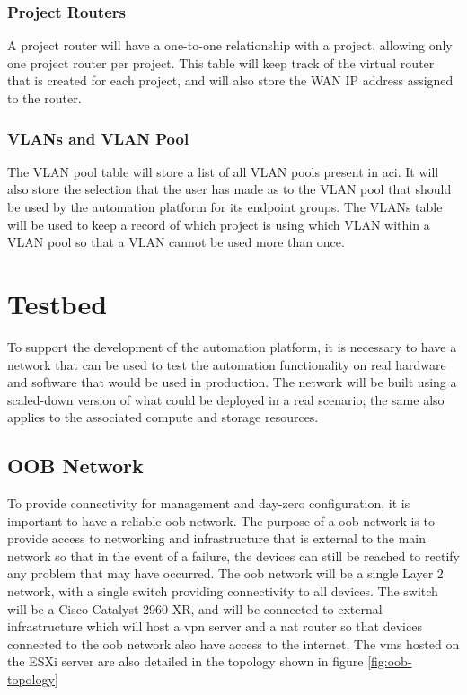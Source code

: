 \subsubsection{Project Routers}
\label{design:web-application:database:project-routers}
A project router will
have a one-to-one relationship with a project, allowing only one project router
per project. This table will keep track of the virtual router that is created
for each project, and will also store the WAN IP address assigned to the
router.

\subsubsection{VLANs and VLAN Pool}
\label{design:web-application:database:vlan-and-vlan-pool}
The VLAN pool table
will store a list of all VLAN pools present in \gls{aci}. It will also store
the selection that the user has made as to the VLAN pool that should be used by
the automation platform for its endpoint groups. The VLANs table will be used
to keep a record of which project is using which VLAN within a VLAN pool so
that a VLAN cannot be used more than once.

\section{Testbed}
\label{design:Testbed}
To support the development of the automation platform,
it is necessary to have a network that can be used to test the automation
functionality on real hardware and software that would be used in production.
The network will be built using a scaled-down version of what could be deployed
in a real scenario; the same also applies to the associated compute and storage
resources.

\subsection{OOB Network}
\label{design:Testbed:network-design:oob}
To provide connectivity for management and day-zero configuration, it is
important to have a reliable \gls{oob} network. The purpose of a \gls{oob}
network is to provide access to networking and infrastructure that is external
to the main network so that in the event of a failure, the devices can still be
reached to rectify any problem that may have occurred. The \gls{oob} network
will be a single Layer 2 network, with a single switch providing connectivity
to all devices. The switch will be a Cisco Catalyst 2960-XR, and will be
connected to external infrastructure which will host a \gls{vpn} server and a
\gls{nat} router so that devices connected to the \gls{oob} network also have
access to the internet. The \gls{vm}s hosted on the ESXi server are also
detailed in the topology shown in figure \ref{fig:oob-topology}

